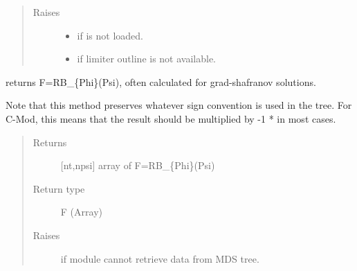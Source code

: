 \documentclass[letterpaper,10pt,english]{sphinxmanual}
\begin{document}
\begin{fulllineitems}
\begin{fulllineitems}
\begin{quote}
\begin{description}
\item[{Raises}] \leavevmode\begin{itemize}
\item {} 
 \textendash{} if  is not loaded.

\item {} 
 \textendash{} if limiter outline is not available.

\end{itemize}

\end{description}\end{quote}

\end{fulllineitems}


\begin{fulllineitems}
\label{\detokenize{eqtools:eqtools.EFIT.EFITTree.getF}}
returns F=RB\_\{Phi\}(Psi), often calculated for grad-shafranov
solutions.

Note that this method preserves whatever sign convention is used in the
tree. For C-Mod, this means that the result should be multiplied by
-1 * {\hyperref[\detokenize{eqtools:eqtools.EFIT.EFITTree.getCurrentSign}]{}} in most cases.
\begin{quote}\begin{description}
\item[{Returns}] \leavevmode
{[}nt,npsi{]} array of F=RB\_\{Phi\}(Psi)

\item[{Return type}] \leavevmode
F (Array)

\item[{Raises}] \leavevmode
{} \textendash{} if module cannot retrieve data from MDS tree.

\end{description}\end{quote}

\end{fulllineitems}



\end{fulllineitems}
\end{document}
